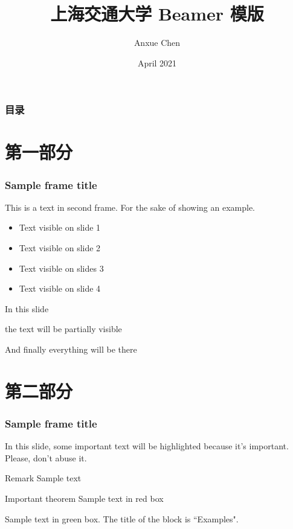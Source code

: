 \documentclass[xcolor=table,dvipsnames,svgnames,aspectratio=169,fontset=macnew]{ctexbeamer}
\title[SJTU Beamer Template] %
{\textbf{上海交通大学 Beamer 模版}} %
\author[Anxue Chen]
{Anxue Chen}
\institute[SJTU]{Shanghai Jiao Tong University}
\date{April 2021}
\begin{document}
\frame{\titlepage}

\begin{frame}
	\frametitle{目录}
	\tableofcontents
\end{frame}

\section{第一部分}

\begin{frame}
	\frametitle{Sample frame title}
	This is a text in second frame. For the sake of showing an example.

	\begin{itemize}
		\item<1-> Text visible on slide 1
		\item<2-> Text visible on slide 2
		\item<3> Text visible on slides 3
		\item<4-> Text visible on slide 4
	\end{itemize}
\end{frame}

\begin{frame}
	In this slide \pause

	the text will be partially visible \pause

	And finally everything will be there
\end{frame}

\section{第二部分}

\begin{frame}
	\frametitle{Sample frame title}

	In this slide, some important text will be
	\alert{highlighted} because it's important.
	Please, don't abuse it.

	\begin{block}{Remark}
		Sample text
	\end{block}

	\begin{alertblock}{Important theorem}
		Sample text in red box
	\end{alertblock}

	\begin{examples}
		Sample text in green box. The title of the block is ``Examples".
	\end{examples}
\end{frame}
\end{document}
